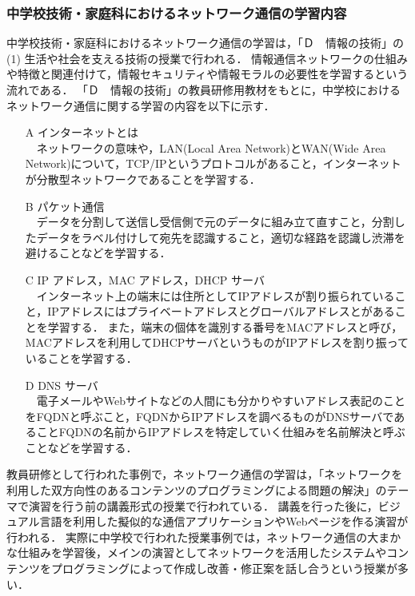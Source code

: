 \documentclass[12pt,a4j,titlepage]{ltjsarticle}
\begin{document}
\subsubsection{中学校技術・家庭科におけるネットワーク通信の学習内容}
中学校技術・家庭科におけるネットワーク通信の学習は，「Ｄ　情報の技術」の(1) 生活や社会を支える技術の授業で行われる．
情報通信ネットワークの仕組みや特徴と関連付けて，情報セキュリティや情報モラルの必要性を学習するという流れである．
「Ｄ　情報の技術」の教員研修用教材をもとに，中学校におけるネットワーク通信に関する学習の内容を以下に示す\cite{tyugaku_kensyu}．
\begin{enumerate}

\item[A] インターネットとは\mbox{}\\
　ネットワークの意味や，LAN(Local Area Network)とWAN(Wide Area Network)について，TCP/IPというプロトコルがあること，インターネットが分散型ネットワークであることを学習する．

\item[B] パケット通信\mbox{}\\
　データを分割して送信し受信側で元のデータに組み立て直すこと，分割したデータをラベル付けして宛先を認識すること，適切な経路を認識し渋滞を避けることなどを学習する．

\item[C] IP アドレス，MAC アドレス，DHCP サーバ\mbox{}\\
　インターネット上の端末には住所としてIPアドレスが割り振られていること，IPアドレスにはプライベートアドレスとグローバルアドレスとがあることを学習する．
 また，端末の個体を識別する番号をMACアドレスと呼び，MACアドレスを利用してDHCPサーバというものがIPアドレスを割り振っていることを学習する．
\item[D] DNS サーバ\mbox{}\\
　電子メールやWebサイトなどの人間にも分かりやすいアドレス表記のことをFQDNと呼ぶこと，FQDNからIPアドレスを調べるものがDNSサーバであることFQDNの名前からIPアドレスを特定していく仕組みを名前解決と呼ぶことなどを学習する．
\end{enumerate}

教員研修として行われた事例で\cite{tyugaku_kensyu2}，ネットワーク通信の学習は，「ネットワークを利用した双方向性のあるコンテンツのプログラミングによる問題の解決」のテーマで演習を行う前の講義形式の授業で行われている．
講義を行った後に，ビジュアル言語を利用した擬似的な通信アプリケーションやWebページを作る演習が行われる．
実際に中学校で行われた授業事例では，ネットワーク通信の大まかな仕組みを学習後，メインの演習としてネットワークを活用したシステムやコンテンツをプログラミングによって作成し改善・修正案を話し合うという授業が多い\cite{tyugaku_jirei}．
\end{document}

